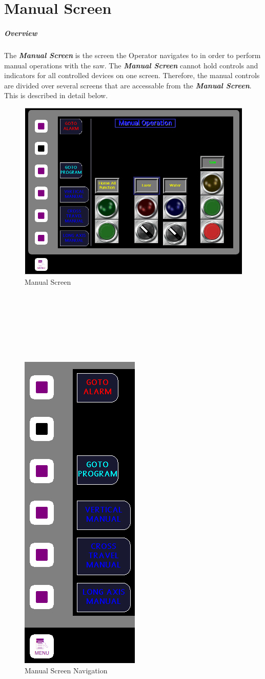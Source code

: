 \chapter{Manual Screen}
\paragraph{Overview} The \textbf{\textit{Manual Screen}} is the screen the Operator navigates to in order to perform manual operations with the saw. The \textbf{\textit{Manual Screen}} cannot hold controls and indicators for all controlled devices on one screen. Therefore, the manual controls are divided over several screens that are accessable from the \textbf{\textit{Manual Screen}}. This is described in detail below.
\begin{figure}
	\centering
	\includegraphics[width=0.5
	\linewidth]{screen-captures/manual}
	\caption{Manual Screen}
	\label{fig:manual-screen}
\end{figure}
\\
\\
\\
\\
\\
\\
\pagebreak
\begin{figure}
	\centering
	\includegraphics[width=.3\linewidth]{screen-captures/manual-nav}
	\caption{Manual Screen Navigation}
	\label{fig:manual-nav}
\end{figure}

